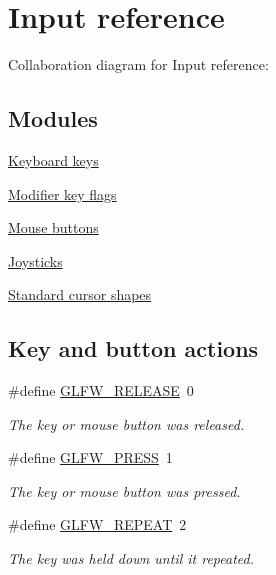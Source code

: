 \hypertarget{group__input}{
\section{Input reference}
\label{group__input}
}


Collaboration diagram for Input reference:\subsection*{Modules}
\begin{CompactItemize}
\item 
\hyperlink{group__keys}{Keyboard keys}
\item 
\hyperlink{group__mods}{Modifier key flags}
\item 
\hyperlink{group__buttons}{Mouse buttons}
\item 
\hyperlink{group__joysticks}{Joysticks}
\item 
\hyperlink{group__shapes}{Standard cursor shapes}
\end{CompactItemize}
\subsection*{Key and button actions}
\begin{CompactItemize}
\item 
\#define \hyperlink{group__input_gda11d965c4da13090ad336e030e4d11f}{GLFW\_\-RELEASE}~0
\begin{CompactList}\small\item\em The key or mouse button was released. \item\end{CompactList}\item 
\#define \hyperlink{group__input_g2485743d0b59df3791c45951c4195265}{GLFW\_\-PRESS}~1
\begin{CompactList}\small\item\em The key or mouse button was pressed. \item\end{CompactList}\item 
\#define \hyperlink{group__input_gc96fd3b9fc66c6f0eebaf6532595338f}{GLFW\_\-REPEAT}~2
\begin{CompactList}\small\item\em The key was held down until it repeated. \item\end{CompactList}\end{CompactItemize}

